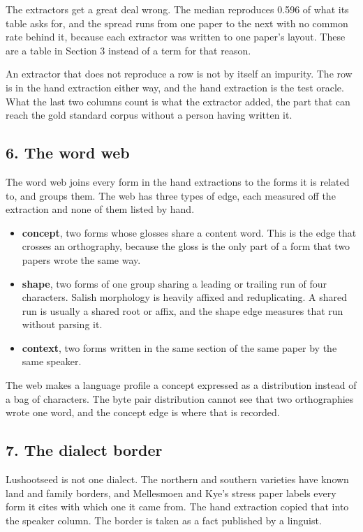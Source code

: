 The extractors get a great deal wrong. The median reproduces 0.596 of what its table asks for, and the spread runs from one paper to the next with no common rate behind it, because each extractor was written to one paper's layout. These are a table in Section 3 instead of a term for that reason.

An extractor that does not reproduce a row is not by itself an impurity. The row is in the hand extraction either way, and the hand extraction is the test oracle. What the last two columns count is what the extractor added, the part that can reach the gold standard corpus without a person having written it.

\subsection{6. The word web}

The word web joins every form in the hand extractions to the forms it is related to, and groups them. The web has three types of edge, each measured off the extraction and none of them listed by hand.

\begin{itemize}
\item \textbf{concept}, two forms whose glosses share a content word. This is the edge that crosses an orthography, because the gloss is the only part of a form that two papers wrote the same way.
\item \textbf{shape}, two forms of one group sharing a leading or trailing run of four characters. Salish morphology is heavily affixed and reduplicating. A shared run is usually a shared root or affix, and the shape edge measures that run without parsing it.
\item \textbf{context}, two forms written in the same section of the same paper by the same speaker.
\end{itemize}

The web makes a language profile a concept expressed as a distribution instead of a bag of characters. The byte pair distribution cannot see that two orthographies wrote one word, and the concept edge is where that is recorded.

\subsection{7. The dialect border}

Lushootseed is not one dialect. The northern and southern varieties have known land and family borders, and Mellesmoen and Kye's stress paper labels every form it cites with which one it came from. The hand extraction copied that into the speaker column. The border is taken as a fact published by a linguist.

